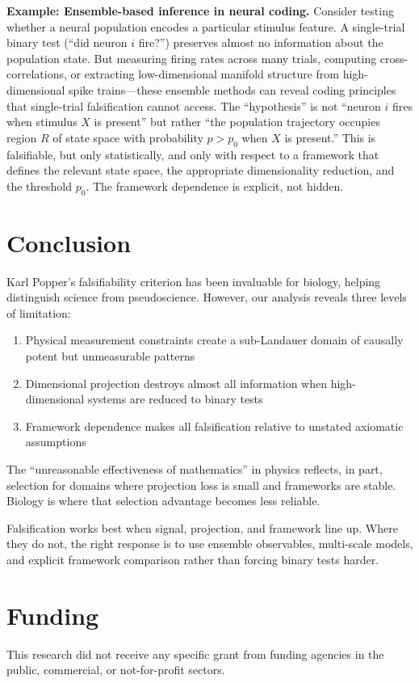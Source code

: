 \documentclass[12pt]{article}
\begin{document}
\textbf{Example: Ensemble-based inference in neural coding.} Consider testing whether a neural population encodes a particular stimulus feature. A single-trial binary test (``did neuron $i$ fire?'') preserves almost no information about the population state. But measuring firing rates across many trials, computing cross-correlations, or extracting low-dimensional manifold structure from high-dimensional spike trains---these ensemble methods can reveal coding principles that single-trial falsification cannot access. The ``hypothesis'' is not ``neuron $i$ fires when stimulus $X$ is present'' but rather ``the population trajectory occupies region $R$ of state space with probability $p > p_0$ when $X$ is present.'' This is falsifiable, but only statistically, and only with respect to a framework that defines the relevant state space, the appropriate dimensionality reduction, and the threshold $p_0$. The framework dependence is explicit, not hidden.

\section{Conclusion}

Karl Popper's falsifiability criterion has been invaluable for biology, helping distinguish science from pseudoscience. However, our analysis reveals three levels of limitation:

\begin{enumerate}
\item Physical measurement constraints create a sub-Landauer domain of causally potent but unmeasurable patterns
\item Dimensional projection destroys almost all information when high-dimensional systems are reduced to binary tests
\item Framework dependence makes all falsification relative to unstated axiomatic assumptions
\end{enumerate}

The ``unreasonable effectiveness of mathematics'' in physics reflects, in part, selection for domains where projection loss is small and frameworks are stable. Biology is where that selection advantage becomes less reliable.

Falsification works best when signal, projection, and framework line up. Where they do not, the right response is to use ensemble observables, multi-scale models, and explicit framework comparison rather than forcing binary tests harder.

\section*{Funding}
This research did not receive any specific grant from funding agencies in the public, commercial, or not-for-profit sectors.
\end{document}
